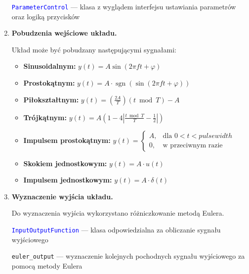 \documentclass[10pt, a4paper]{article}
\begin{document}
\begin{enumerate}[label=\alph*.]
  \textcolor{blue}{\texttt{ParameterControl}} --- klasa z wyglądem interfejsu ustawiania parametrów oraz logiką przycisków


  \vspace{0.2cm}
  
  \item \textbf{Pobudzenia wejściowe układu.} \par\vspace{0.1cm}
  Układ może być pobudzany następującymi sygnałami: 
  \begin{itemize}
  \item \textbf{Sinusoidalnym:} \( y(t) = A \sin(2\pi f t + \varphi) \)
  \item \textbf{Prostokątnym:} \( y(t) = A \cdot \operatorname{sgn}\left( \sin(2\pi f t + \varphi) \right) \)
  \item \textbf{Piłokształtnym:} \( y(t) = \left( \frac{2A}{T} \right) (t \bmod T) - A \)
  \item \textbf{Trójkątnym:} \(y(t) = A \left(1 - 4 \left| \frac{t \bmod T}{T} - \frac{1}{2} \right| \right)\)
  \item \textbf{Impulsem prostokątnym:} \( y(t) = 
  \begin{cases}
  A, & \text{dla } 0 < t < pulse width \\
  0, & \text{w przeciwnym razie}
  \end{cases}
  \)
  \item \textbf{Skokiem jednostkowym:} \( y(t) = A \cdot u(t) \)
  \item \textbf{Impulsem jednostkowym:} \(y(t) = A \cdot \delta(t)\)
\end{itemize}

\vspace{0.2cm}
  
  \item \textbf{Wyznaczenie wyjścia układu.} \par\vspace{0.1cm}
  Do wyznaczenia wyjścia wykorzystano różniczkowanie metodą Eulera. 

  \vspace{0.1cm}

  \textcolor{blue}{\texttt{InputOutputFunction}} --- klasa odpowiedzialna za obliczanie sygnału wyjściowego
  

\vspace{0.1cm}

{\texttt{euler\_output}} --- wyznaczenie kolejnych pochodnych sygnału wyjściowego za pomocą metody Eulera


\end{enumerate}
\end{document}
